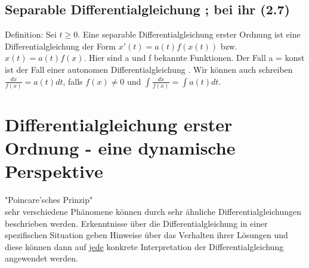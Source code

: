 \documentclass[12pt,a4paper]{article}
\newcommand{\DGL}{Differentialgleichung }
\newcommand{\DGLs}{Differentialgleichungen }
\begin{document}
\subsection{Separable \DGL; bei ihr (2.7)}
Definition: Sei $t\geq0$. Eine separable \DGL erster Ordnung ist eine \DGL der Form $x'(t) = a(t)f(x(t))$ bzw. $x(t)=a(t)f(x)$. Hier sind a und f bekannte Funktionen. Der Fall a = konst ist der Fall einer autonomen \DGL. Wir können auch schreiben $\frac{dx}{f(x)} = a(t)dt$, falls $f(x) \neq 0$ und $\int \frac{dx}{f(x)} = \int a(t)dt$.
\section{\DGL erster Ordnung - eine dynamische Perspektive}
"Poincare'sches Prinzip" \\
sehr verschiedene Phänomene können durch sehr ähnliche \DGLs beschrieben werden. Erkenntnisse über die \DGL in einer spezifischen Situation geben Hinweise über das Verhalten ihrer Lösungen und diese können dann auf \underline{jede} konkrete Interpretation der \DGL angewendet werden.
\end{document}

